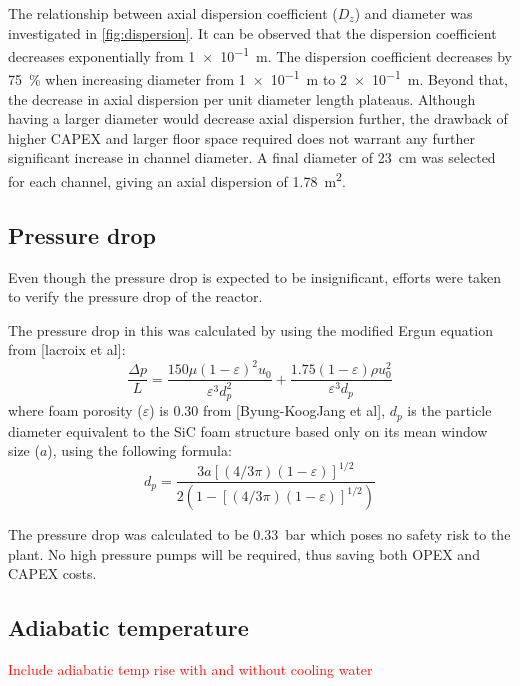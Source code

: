 The relationship between axial dispersion coefficient ($D_z$) and diameter was investigated in \cref{fig:dispersion}. It can be observed that the dispersion coefficient decreases exponentially from \SI{1e-1}{\m}. The dispersion coefficient decreases by \SI{75}{\%} when increasing diameter from \SI{1e-1}{\m} to \SI{2e-1}{\m}. Beyond that, the decrease in axial dispersion per unit diameter length plateaus. Although having a larger diameter would decrease axial dispersion further, the drawback of higher CAPEX and larger floor space required does not warrant any further significant increase in channel diameter. A final diameter of \SI{23}{\cm} was selected for each channel, giving an axial dispersion of \SI{1.78}{\metre \squared}. 
\subsection{Pressure drop}
Even though the pressure drop is expected to be insignificant, efforts were taken to verify the pressure drop of the reactor.

The pressure drop in this was calculated by using the modified Ergun equation from [lacroix et al]: 
\begin{equation}
    \frac{\Delta p}{L} = \frac{150 \mu (1- \varepsilon)^2 u_0}{\varepsilon^3 d_p^2} + \frac{1.75(1-\varepsilon)\rho u_0^2}{\varepsilon^3 d_p}
    \label{eqn:ergun}
\end{equation}
where foam porosity ($\varepsilon$) is 0.30 from  [Byung-KoogJang et al], $d_p$ is the particle diameter equivalent to the SiC foam structure based only on its mean window size ($a$), using the following formula:
\begin{equation}
d_{p}=\frac{3a[(4 / 3 \pi)(1-\varepsilon)]^{1 / 2}}{2(1-[(4 / 3 \pi)(1-\varepsilon)]^{1 / 2})}
\end{equation}

The pressure drop was calculated to be \SI{0.33}{\bar} which poses no safety risk to the plant. No high pressure pumps will be required, thus saving both OPEX and CAPEX costs.


\subsection{Adiabatic temperature}

\label{sec:adiabatic}
\textcolor{red}{Include adiabatic temp rise with and without cooling water}

